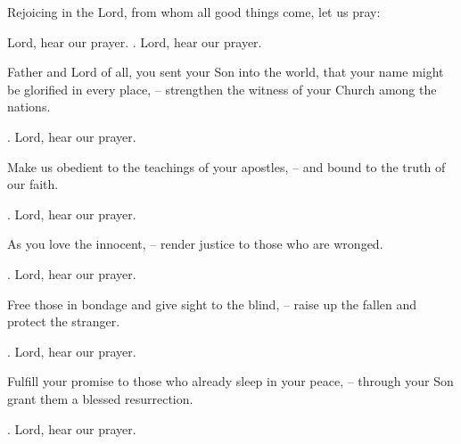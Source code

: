 \lettrine[loversize=0.15,lines=2]{R}{}ejoicing in the Lord, from whom all good things come, let us pray: \par Lord, hear our prayer.
\Rbar. Lord, hear our prayer.

Father and Lord of all, you sent your Son into the world, that your name might be glorified in every place,
– strengthen the witness of your Church among the nations.
\par \Rbar. Lord, hear our prayer.

Make us obedient to the teachings of your apostles,
– and bound to the truth of our faith.
\par \Rbar. Lord, hear our prayer.

As you love the innocent,
– render justice to those who are wronged.
\par \Rbar. Lord, hear our prayer.

Free those in bondage and give sight to the blind,
– raise up the fallen and protect the stranger.
\par \Rbar. Lord, hear our prayer.

Fulfill your promise to those who already sleep in your peace,
– through your Son grant them a blessed resurrection.
\par \Rbar. Lord, hear our prayer.
